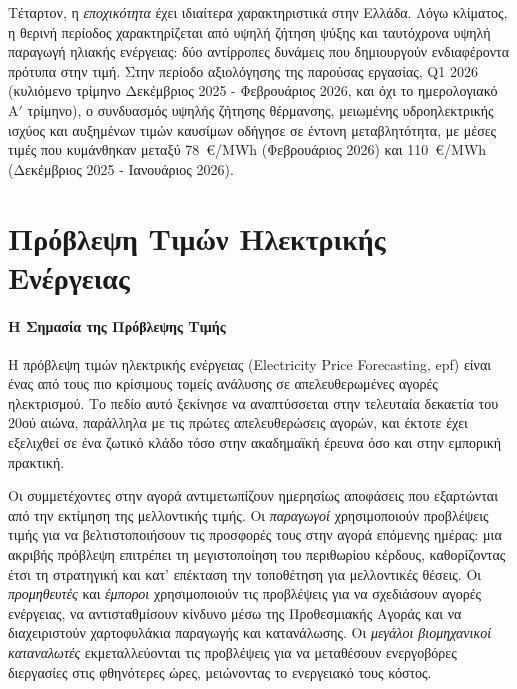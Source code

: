 Τέταρτον, η \textit{εποχικότητα} έχει ιδιαίτερα χαρακτηριστικά στην Ελλάδα. Λόγω
κλίματος, η θερινή περίοδος χαρακτηρίζεται από υψηλή ζήτηση ψύξης και ταυτόχρονα
υψηλή παραγωγή ηλιακής ενέργειας: δύο αντίρροπες δυνάμεις που δημιουργούν ενδιαφέροντα
πρότυπα στην τιμή. Στην περίοδο αξιολόγησης της παρούσας εργασίας, Q1 2026 (κυλιόμενο τρίμηνο
Δεκέμβριος 2025 - Φεβρουάριος 2026, και όχι το ημερολογιακό Α$'$ τρίμηνο),
ο συνδυασμός υψηλής ζήτησης θέρμανσης, μειωμένης
υδροηλεκτρικής ισχύος και αυξημένων τιμών καυσίμων οδήγησε σε έντονη μεταβλητότητα,
με μέσες τιμές που κυμάνθηκαν μεταξύ 78~€/MWh (Φεβρουάριος 2026) και 110~€/MWh
(Δεκέμβριος 2025 - Ιανουάριος 2026).


\section{Πρόβλεψη Τιμών Ηλεκτρικής Ενέργειας}
\label{sec:epf_intro}

\paragraph{Η Σημασία της Πρόβλεψης Τιμής}

Η πρόβλεψη τιμών ηλεκτρικής ενέργειας (Electricity Price Forecasting, \acrshort{epf}) είναι ένας από τους πιο κρίσιμους τομείς ανάλυσης σε απελευθερωμένες αγορές
ηλεκτρισμού. Το πεδίο αυτό ξεκίνησε να αναπτύσσεται στην τελευταία δεκαετία του
20ού αιώνα, παράλληλα με τις πρώτες απελευθερώσεις αγορών, και έκτοτε έχει εξελιχθεί
σε ένα ζωτικό κλάδο τόσο στην ακαδημαϊκή έρευνα όσο και στην εμπορική πρακτική.

Οι συμμετέχοντες στην αγορά αντιμετωπίζουν ημερησίως αποφάσεις που εξαρτώνται
από την εκτίμηση της μελλοντικής τιμής. Οι \textit{παραγωγοί} χρησιμοποιούν προβλέψεις
τιμής για να βελτιστοποιήσουν τις προσφορές τους στην αγορά επόμενης ημέρας: μια ακριβής
πρόβλεψη επιτρέπει τη μεγιστοποίηση του περιθωρίου κέρδους, καθορίζοντας έτσι τη στρατηγική και κατ' επέκταση την τοποθέτηση για μελλοντικές θέσεις. Οι \textit{προμηθευτές} και
\textit{έμποροι} χρησιμοποιούν τις προβλέψεις για να σχεδιάσουν αγορές ενέργειας,
να αντισταθμίσουν κίνδυνο μέσω της Προθεσμιακής Αγοράς και να διαχειριστούν χαρτοφυλάκια
παραγωγής και κατανάλωσης. Οι \textit{μεγάλοι βιομηχανικοί καταναλωτές} εκμεταλλεύονται
τις προβλέψεις για να μεταθέσουν ενεργοβόρες διεργασίες στις φθηνότερες ώρες, μειώνοντας
το ενεργειακό τους κόστος.

